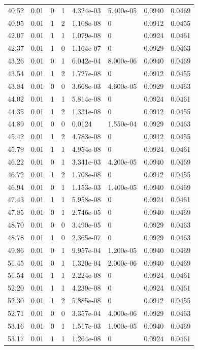 \documentclass[preview]{standalone}
\begin{document}
{{{\begin{tabular}{L{1.2cm}C{1.2cm} C{0.3cm}C{0.5cm} C{1.4cm}C{1.4cm} C{1.4cm}C{1.4cm}}
  40.52  &  0.01  & 0     &  1 &  4.324e-03  & 5.400e-05  & 0.0940 &  0.0469   \\ 
  40.95  &  0.01  & 1     &  2 &  1.108e-08  & 0  & 0.0912 &  0.0455   \\ 
  42.07  &  0.01  & 1     &  1 &  1.079e-08  & 0  & 0.0924 &  0.0461   \\ 
  42.37  &  0.01  & 1     &  0 &  1.164e-07  & 0  & 0.0929 &  0.0463   \\ 
  43.26  &  0.01  & 0     &  1 &  6.042e-04  & 8.000e-06  & 0.0940 &  0.0469   \\ 
  43.54  &  0.01  & 1     &  2 &  1.727e-08  & 0  & 0.0912 &  0.0455   \\ 
  43.84  &  0.01  & 0     &  0 &  3.668e-03  & 4.600e-05  & 0.0929 &  0.0463   \\ 
  44.02  &  0.01  & 1     &  1 &  5.814e-08  & 0  & 0.0924 &  0.0461   \\ 
  44.35  &  0.01  & 1     &  2 &  1.331e-08  & 0  & 0.0912 &  0.0455   \\ 
  44.89  &  0.01  & 0     &  0 &  0.0124  & 1.550e-04  & 0.0929 &  0.0463   \\ 
  45.42  &  0.01  & 1     &  2 &  4.783e-08  & 0  & 0.0912 &  0.0455   \\ 
  45.79  &  0.01  & 1     &  1 &  4.954e-08  & 0  & 0.0924 &  0.0461   \\ 
  46.22  &  0.01  & 0     &  1 &  3.341e-03  & 4.200e-05  & 0.0940 &  0.0469   \\ 
  46.72  &  0.01  & 1     &  2 &  1.708e-08  & 0  & 0.0912 &  0.0455   \\ 
  46.94  &  0.01  & 0     &  1 &  1.153e-03  & 1.400e-05  & 0.0940 &  0.0469   \\ 
  47.43  &  0.01  & 1     &  1 &  5.958e-08  & 0  & 0.0924 &  0.0461   \\ 
  47.85  &  0.01  & 0     &  1 &  2.746e-05  & 0  & 0.0940 &  0.0469   \\ 
  48.70  &  0.01  & 0     &  0 &  3.490e-05  & 0  & 0.0929 &  0.0463   \\ 
  48.78  &  0.01  & 1     &  0 &  2.365e-07  & 0  & 0.0929 &  0.0463   \\ 
  49.86  &  0.01  & 0     &  1 &  9.957e-04  & 1.200e-05  & 0.0940 &  0.0469   \\ 
  51.45  &  0.01  & 0     &  1 &  1.320e-04  & 2.000e-06  & 0.0940 &  0.0469   \\ 
  51.54  &  0.01  & 1     &  1 &  2.224e-08  & 0  & 0.0924 &  0.0461   \\ 
  52.20  &  0.01  & 1     &  1 &  4.239e-08  & 0  & 0.0924 &  0.0461   \\ 
  52.30  &  0.01  & 1     &  2 &  5.885e-08  & 0  & 0.0912 &  0.0455   \\ 
  52.71  &  0.01  & 0     &  0 &  3.357e-04  & 4.000e-06  & 0.0929 &  0.0463   \\ 
  53.16  &  0.01  & 0     &  1 &  1.517e-03  & 1.900e-05  & 0.0940 &  0.0469   \\ 
  53.17  &  0.01  & 1     &  1 &  1.264e-08  & 0  & 0.0924 &  0.0461   \\ 
\hline 
\end{tabular} 

}}}
\end{document}
